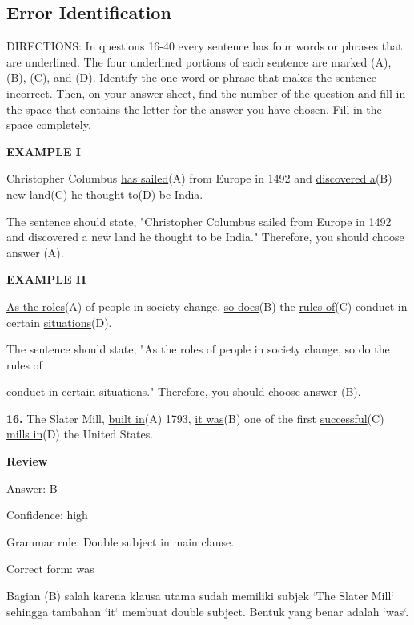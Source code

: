 \documentclass[12pt]{article}
\begin{document}
\subsection*{Error Identification}
DIRECTIONS: In questions 16-40 every sentence has four words or phrases that are underlined. The four underlined portions of each sentence are marked (A), (B), (C), and (D). Identify the one word or phrase that makes the sentence incorrect. Then, on your answer sheet, find the number of the question and fill in the space that contains the letter for the answer you have chosen. Fill in the space completely.\par
\begin{exampleblock}
\textbf{EXAMPLE I}\par
Christopher Columbus \uline{has sailed}(A) from Europe in 1492 and \uline{discovered a}(B) \uline{new land}(C) he \uline{thought to}(D) be India.\par
The sentence should state, "Christopher Columbus sailed from Europe in 1492 and discovered a new land he thought to be India." Therefore, you should choose answer (A).\par
\end{exampleblock}
\begin{exampleblock}
\textbf{EXAMPLE II}\par
\uline{As the roles}(A) of people in society change, \uline{so does}(B) the \uline{rules of}(C) conduct in certain \uline{situations}(D).\par
The sentence should state, "As the roles of people in society change, so do the rules of\par
conduct in certain situations." Therefore, you should choose answer (B).\par
\end{exampleblock}
\noindent\textbf{16.} The Slater Mill, \uline{built in}(A) 1793, \uline{it was}(B) one of the first \uline{successful}(C) \uline{mills in}(D) the United States.
\par
\begingroup
\setlength{\parskip}{0pt}
\setlength{\parindent}{0pt}
\textbf{Review}\par
Answer: B\par
Confidence: high\par
Grammar rule: Double subject in main clause.\par
Correct form: was\par
Bagian (B) salah karena klausa utama sudah memiliki subjek `The Slater Mill` sehingga tambahan `it` membuat double subject. Bentuk yang benar adalah `was`.\par
\end{document}
